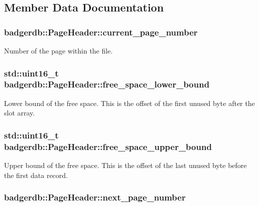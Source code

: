 \subsection{Member Data Documentation}
\hypertarget{structbadgerdb_1_1PageHeader_a3f721c5ce9ef491fdc9d12292f2f4498}{
\subsubsection[{current\-\_\-page\-\_\-number}]{ badgerdb\-::\-Page\-Header\-::current\-\_\-page\-\_\-number}}\label{structbadgerdb_1_1PageHeader_a3f721c5ce9ef491fdc9d12292f2f4498}
Number of the page within the file. \hypertarget{structbadgerdb_1_1PageHeader_ac71c5a9b3b8644da0ea827f5bd4c5742}{
\subsubsection[{free\-\_\-space\-\_\-lower\-\_\-bound}]{\setlength{\rightskip}{0pt plus 5cm}std\-::uint16\-\_\-t badgerdb\-::\-Page\-Header\-::free\-\_\-space\-\_\-lower\-\_\-bound}}\label{structbadgerdb_1_1PageHeader_ac71c5a9b3b8644da0ea827f5bd4c5742}
Lower bound of the free space. This is the offset of the first unused byte after the slot array. \hypertarget{structbadgerdb_1_1PageHeader_a3af3c066d7651294fb3aae104f404648}{
\subsubsection[{free\-\_\-space\-\_\-upper\-\_\-bound}]{\setlength{\rightskip}{0pt plus 5cm}std\-::uint16\-\_\-t badgerdb\-::\-Page\-Header\-::free\-\_\-space\-\_\-upper\-\_\-bound}}\label{structbadgerdb_1_1PageHeader_a3af3c066d7651294fb3aae104f404648}
Upper bound of the free space. This is the offset of the last unused byte before the first data record. \hypertarget{structbadgerdb_1_1PageHeader_a7cb8260dedb0748d3d75c4b1722dcf3c}{
\subsubsection[{next\-\_\-page\-\_\-number}]{ badgerdb\-::\-Page\-Header\-::next\-\_\-page\-\_\-number}}\label{structbadgerdb_1_1PageHeader_a7cb8260dedb0748d3d75c4b1722dcf3c}
